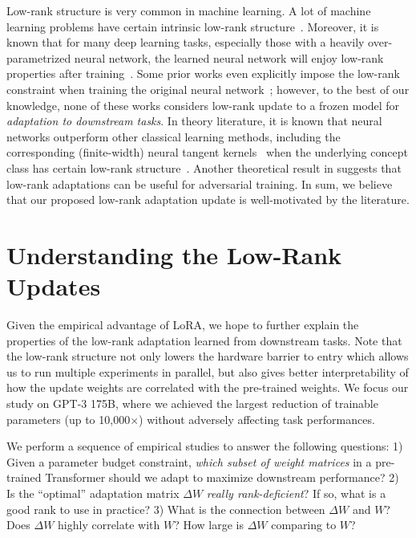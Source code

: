  Low-rank structure is very common in machine learning.
A lot of machine learning problems have certain intrinsic low-rank structure~\citep{li2016recovery,cai2010singular,li2018algorithmic,grasedyck2013literature}.
Moreover, it is known that for many deep learning tasks, especially those with a heavily over-parametrized neural network, the learned neural network will enjoy low-rank properties after training~\citep{oymak2019generalization}.
Some prior works even explicitly impose the low-rank constraint when training the original neural network~\citep{sainath2013low,povey2018semi,zhang2014extracting,jaderberg2014speeding,zhao2016low,khodak2021initialization,denil2014predicting}; however, to the best of our knowledge, none of these works considers low-rank update to a frozen model for \emph{adaptation to downstream tasks}.
In theory literature, it is known that neural networks outperform other classical learning methods, including the corresponding (finite-width) neural tangent kernels~\citep{als18dnn,li2018learning} when the underlying concept class has certain low-rank structure~\citep{ghorbani2020neural,AL2019-resnet,allen2020backward}. 
Another theoretical result in \citet{allen2020feature} suggests that low-rank adaptations can be useful for adversarial training.
In sum, we believe that our proposed low-rank adaptation update is well-motivated by the literature. 

\section{Understanding the Low-Rank Updates}
\label{sec:science}

Given the empirical advantage of LoRA, we hope to further explain the properties of the low-rank adaptation learned from downstream tasks.
Note that the low-rank structure not only lowers the hardware barrier to entry which allows us to run multiple experiments in parallel, but also gives better interpretability of how the update weights are correlated with the pre-trained weights.
We focus our study on GPT-3 175B, where we achieved the largest reduction of trainable parameters (up to 10,000$\times$) without adversely affecting task performances.

We perform a sequence of empirical studies to answer the following questions:
1) Given a parameter budget constraint, \emph{which subset of weight matrices} in a pre-trained Transformer should we adapt to maximize downstream performance?
2) Is the ``optimal'' adaptation matrix $\Delta W$ \emph{really rank-deficient}? If so, what is a good rank to use in practice?
3) What is the connection between $\Delta W$ and $W$? Does $\Delta W$ highly correlate with $W$? How large is $\Delta W$ comparing to $W$?


